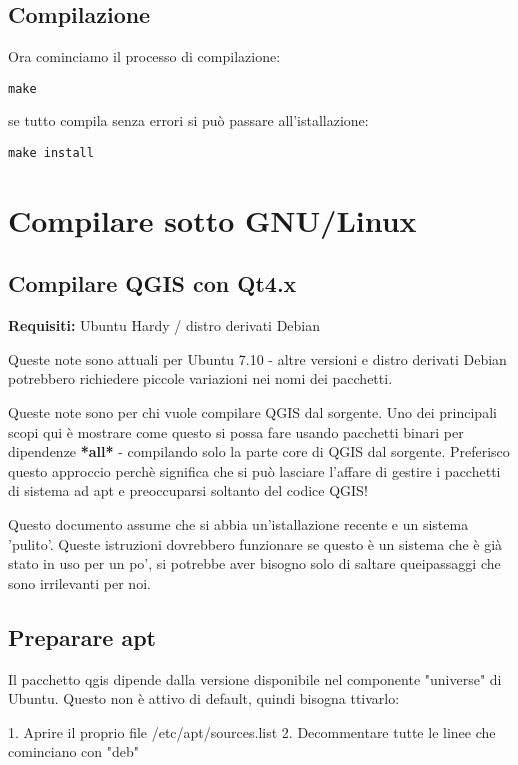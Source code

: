 \subsection{Compilazione}
Ora cominciamo il processo di compilazione:

\begin{verbatim}
make 
\end{verbatim}

se tutto compila senza errori si può passare all'istallazione:

\begin{verbatim}
make install 
\end{verbatim}

\section{Compilare sotto GNU/Linux}\label{sec:install_linux}
\subsection{Compilare QGIS con Qt4.x}
\textbf{Requisiti:} Ubuntu Hardy / distro derivati Debian 

Queste note sono attuali per Ubuntu 7.10 - altre versioni e distro derivati Debian potrebbero richiedere piccole variazioni nei nomi dei pacchetti.

Queste note sono per chi vuole compilare QGIS dal sorgente. Uno dei principali scopi qui è mostrare come questo si possa fare usando pacchetti binari per dipendenze \textbf{*all*} - compilando solo la parte core di QGIS dal sorgente. Preferisco questo approccio perchè significa che si può lasciare l'affare di gestire i pacchetti di sistema ad apt e preoccuparsi soltanto del codice QGIS! 

Questo documento assume che si abbia un'istallazione recente e un sistema 'pulito'. Queste istruzioni dovrebbero funzionare se questo è un sistema che è già stato in uso per un po', si potrebbe aver bisogno solo di saltare queipassaggi che sono irrilevanti per noi.

\subsection{Preparare apt}
Il pacchetto qgis dipende dalla versione disponibile nel componente "universe" di Ubuntu. Questo non è attivo di default, quindi bisogna ttivarlo:

1. Aprire il proprio file /etc/apt/sources.list
2. Decommentare tutte le linee che cominciano con "deb"

